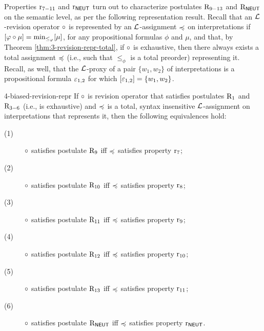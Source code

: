 Properties $\mathrm{r}_{7-11}$ and $\mathrm{r}_{\mathsf{NEUT}}$ 
turn out to characterize postulates $\mathrm{R}_{9-13}$ and $\mathrm{R}_{\mathsf{NEUT}}$ 
on the semantic level,
as per the following representation result.
Recall that an $\mathcal{L}$-revision operator $\circ$ is
represented by an $\mathcal{L}$-assignment $\preccurlyeq$ on interpretations
if $[\varphi\circ \mu] = {\operatorname{min}}_{\le_\varphi}[\mu]$, for any propositional formulas $\phi$ and $\mu$,
and that, by Theorem \ref{thm:3-revision-repr-total},
if $\circ$ is exhaustive, then there always exists a total
assignment $\preccurlyeq$ (i.e., such that $\le_\phi$ is a total preorder) representing it.
Recall, as well, that the $\mathcal{L}$-proxy of a pair $\{w_1,w_2\}$ of interpretations is
a propositional formula $\varepsilon_{1,2}$ 
for which $[\varepsilon_{1,2}]=\{w_1,w_2\}$.

\begin{thm}{}{4-biased-revision-repr}
	If $\circ$ is revision operator that 
	satisfies postulates $\mathrm{R}_{1}$ and $\mathrm{R}_{3-6}$
	(i.e., is exhaustive)
	and $\preccurlyeq$ is a total, syntax insensitive 
	$\mathcal{L}$-assignment on interpretations
	that represents it,
	then the following equivalences hold:
	\begin{description}
		\item[(1)] $\circ$ satisfies postulate $\mathrm{R}_{9}$ iff $\preccurlyeq$ satisfies property $\mathrm{r}_{7}$;
		\item[(2)] $\circ$ satisfies postulate $\mathrm{R}_{10}$ iff $\preccurlyeq$ satisfies property $\mathrm{r}_{8}$;
		\item[(3)] $\circ$ satisfies postulate $\mathrm{R}_{11}$ iff $\preccurlyeq$ satisfies property $\mathrm{r}_{9}$;
		\item[(4)] $\circ$ satisfies postulate $\mathrm{R}_{12}$ iff $\preccurlyeq$ satisfies property $\mathrm{r}_{10}$;
		\item[(5)] $\circ$ satisfies postulate $\mathrm{R}_{13}$ iff $\preccurlyeq$ satisfies property $\mathrm{r}_{11}$;
		\item[(6)] $\circ$ satisfies postulate $\mathrm{R}_{\mathsf{NEUT}}$ iff $\preccurlyeq$ satisfies property $\mathrm{r}_{\mathsf{NEUT}}$.
	\end{description}
\end{thm}

